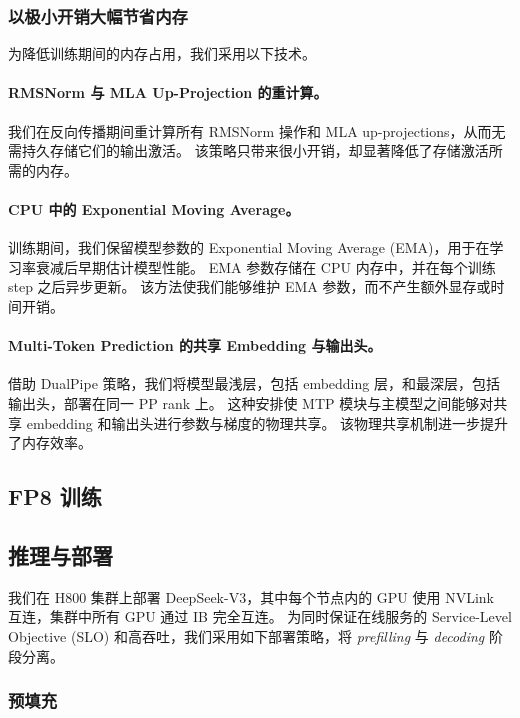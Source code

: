 \documentclass[11pt, a4paper, logo, copyright, nonumbering]{deepseek}
\newcommand{\dsviii}{DeepSeek-V3}
\begin{document}
\subsubsection{以极小开销大幅节省内存}

为降低训练期间的内存占用，我们采用以下技术。

\paragraph{RMSNorm 与 MLA Up-Projection 的重计算。}

我们在反向传播期间重计算所有 RMSNorm 操作和 MLA up-projections，从而无需持久存储它们的输出激活。
该策略只带来很小开销，却显著降低了存储激活所需的内存。

\paragraph{CPU 中的 Exponential Moving Average。}
训练期间，我们保留模型参数的 Exponential Moving Average (EMA)，用于在学习率衰减后早期估计模型性能。
EMA 参数存储在 CPU 内存中，并在每个训练 step 之后异步更新。
该方法使我们能够维护 EMA 参数，而不产生额外显存或时间开销。

\paragraph{Multi-Token Prediction 的共享 Embedding 与输出头。}
借助 DualPipe 策略，我们将模型最浅层，包括 embedding 层，和最深层，包括输出头，部署在同一 PP rank 上。
这种安排使 MTP 模块与主模型之间能够对共享 embedding 和输出头进行参数与梯度的物理共享。
该物理共享机制进一步提升了内存效率。

\subsection{FP8 训练}



\subsection{推理与部署}
\label{sec:inference_deployment}

我们在 H800 集群上部署 \dsviii{}，其中每个节点内的 GPU 使用 NVLink 互连，集群中所有 GPU 通过 IB 完全互连。
为同时保证在线服务的 Service-Level Objective (SLO) 和高吞吐，我们采用如下部署策略，将 \textit{prefilling} 与 \textit{decoding} 阶段分离。

\subsubsection{预填充}
\end{document}
